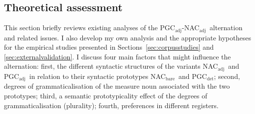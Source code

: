 \documentclass[USenglish]{article}
\newcommand{\Sub}[1]{\ensuremath{\mathrm{_{#1}}}}
\newcommand{\NACb}{NAC\Sub{bare}}
\newcommand{\NACa}{NAC\Sub{adj}}
\newcommand{\PGCd}{PGC\Sub{det}}
\newcommand{\PGCa}{PGC\Sub{adj}}
\begin{document}
\subsection{Theoretical assessment}
\label{sec:analyses}

This section briefly reviews existing analyses of the \PGCa-\NACa\ alternation and related issues.
I also develop my own analysis and the appropriate hypotheses for the empirical studies presented in Sections~\ref{sec:corpusstudies} and \ref{sec:externalvalidation}.
I discuss four main factors that might influence the alternation:
first, the different syntactic structures of the variants \NACa\ and \PGCa\ in relation to their syntactic prototypes \NACb\ and \PGCd;
second, degrees of grammaticalisation of the measure noun associated with the two prototypes;
third, a semantic prototypicality effect of the degrees of grammaticalisation (plurality);
fourth, preferences in different registers.
\end{document}

